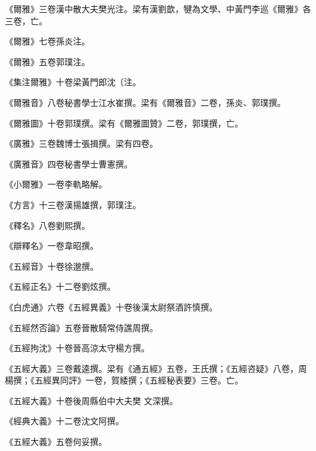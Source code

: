 \begin{pinyinscope}
 《爾雅》三卷漢中散大夫樊光注。梁有漢劉歆，犍為文學、中黃門李巡《爾雅》各三卷，亡。



 《爾雅》七卷孫炎注。



 《爾雅》五卷郭璞注。



 《集注爾雅》十卷梁黃門郎沈〔注。



 《爾雅音》八卷秘書學士江水崔撰。梁有《爾雅音》二卷，孫炎、郭璞撰。



 《爾雅圖》十卷郭璞撰。梁有《爾雅圖贊》二卷，郭璞撰，亡。



 《廣雅》三卷魏博士張揖撰。梁有四卷。



 《廣雅音》四卷秘書學士曹憲撰。



 《小爾雅》一卷李軌略解。



 《方言》十三卷漢揚雄撰，郭璞注。



 《釋名》八卷劉熙撰。



 《辯釋名》一卷韋昭撰。



 《五經音》十卷徐邈撰。



 《五經正名》十二卷劉炫撰。



 《白虎通》六卷《五經異義》十卷後漢太尉祭酒許慎撰。



 《五經然否論》五卷晉散騎常侍譙周撰。



 《五經拘沈》十卷晉高涼太守楊方撰。



 《五經大義》三卷戴逵撰。梁有《通五經》五卷，王氏撰；《五經咨疑》八卷，周楊撰；《五經異同評》一卷，賀緌撰；《五經秘表要》三卷。亡。



 《五經大義》十卷後周縣伯中大夫樊
 文深撰。



 《經典大義》十二卷沈文阿撰。



 《五經大義》五卷何妥撰。




\end{pinyinscope}
